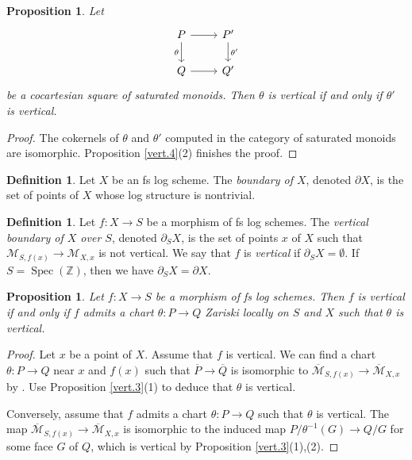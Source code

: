 \documentclass[10pt]{amsart}
\newtheorem{prop}[thm]{Proposition}
\theoremstyle{definition}
\newtheorem{df}[thm]{Definition}
\theoremstyle{remark}
\numberwithin{equation}{subsection}
\newcommand{\Z}{\mathbb{Z}}
\newcommand{\cM}{\mathcal{M}}
\DeclareMathOperator{\Spec}{Spec}
\newcommand{\ol}{\overline}
\begin{document}
\begin{prop}
\label{vert.10}
Let
\[
\begin{tikzcd}
P\ar[d,"\theta"']\ar[r]&
P'\ar[d,"\theta'"]
\\
Q\ar[r]&
Q'
\end{tikzcd}
\]
be a cocartesian square of saturated monoids.
Then $\theta$ is vertical if and only if $\theta'$ is vertical.
\end{prop}
\begin{proof}
The cokernels of $\theta$ and $\theta'$ computed in the category of saturated monoids are isomorphic.
Proposition \ref{vert.4}(2) finishes the proof.
\end{proof}

\begin{df}
Let $X$ be an fs log scheme.
The \emph{boundary of $X$}, denoted $\partial X$, is the set of points of $X$ whose log structure is nontrivial.
\end{df}

\begin{df}
\label{vert.1}
Let $f\colon X\to S$ be a morphism of fs log schemes.
The \emph{vertical boundary of $X$ over $S$}, denoted $\partial_S X$, is the set of points $x$ of $X$ such that $\cM_{S,f(x)}\to \cM_{X,x}$ is not vertical.
We say that $f$ is \emph{vertical} if $\partial_S X=\emptyset$.
If $S=\Spec(\Z)$, then we have $\partial_{S}X = \partial X$.
\end{df}



\begin{prop}
\label{vert.7}
Let $f\colon X\to S$ be a morphism of fs log schemes.
Then $f$ is vertical if and only if $f$ admits a chart $\theta\colon P\to Q$ Zariski locally on $S$ and $X$ such that $\theta$ is vertical.
\end{prop}
\begin{proof}
Let $x$ be a point of $X$.
Assume that $f$ is vertical.
We can find a chart $\theta\colon P\to Q$ near $x$ and $f(x)$ such that $\ol{P}\to \ol{Q}$ is isomorphic to $\ol{\cM}_{S,f(x)}\to \ol{\cM}_{X,x}$ by \cite[Remark II.2.3.2]{Ogu}.
Use Proposition \ref{vert.3}(1) to deduce that $\theta$ is vertical.

Conversely,
assume that $f$ admits a chart $\theta\colon P\to Q$ such that $\theta$ is vertical.
The map
$\ol{\cM}_{S,f(x)}\to \ol{\cM}_{X,x}$ is isomorphic to the induced map $P/\theta^{-1}(G)\to Q/G$ for some face $G$ of $Q$, which is vertical by Proposition \ref{vert.3}(1),(2).
\end{proof}
\end{document}
